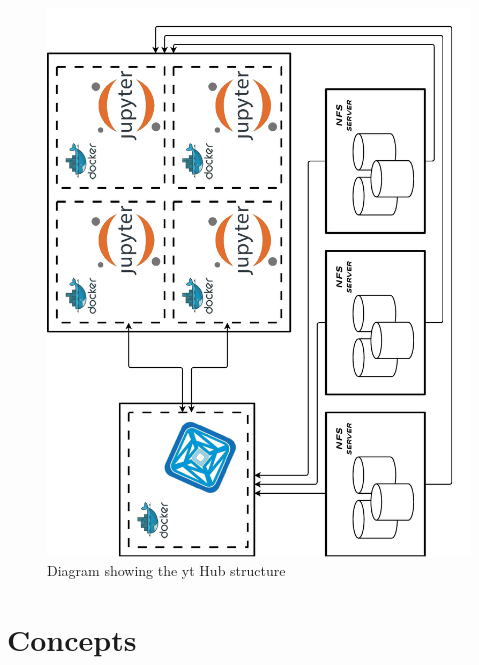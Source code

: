 \documentclass[conference]{IEEEtran}
\begin{document}
\begin{figure}[!t]
\centering
\includegraphics[angle=270, width=5.0in]{ythub_diagram}
\caption{Diagram showing the yt Hub structure}
\label{fig_sim}
\end{figure}

\section{Concepts}
\end{document}
